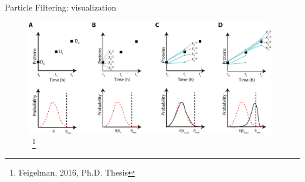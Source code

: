 \documentclass[pdf]
{beamer}
\begin{document}
\begin{frame}{Particle Filtering: visualization}
	\begin{figure}[ht]
		\begin{center}
			\includegraphics[height=2in]{figures/particle_filtering.png}
			~\footnote{Feigelman, 2016, Ph.D. Thesis}
		\end{center}
	\end{figure}
\end{frame}
\end{document}
